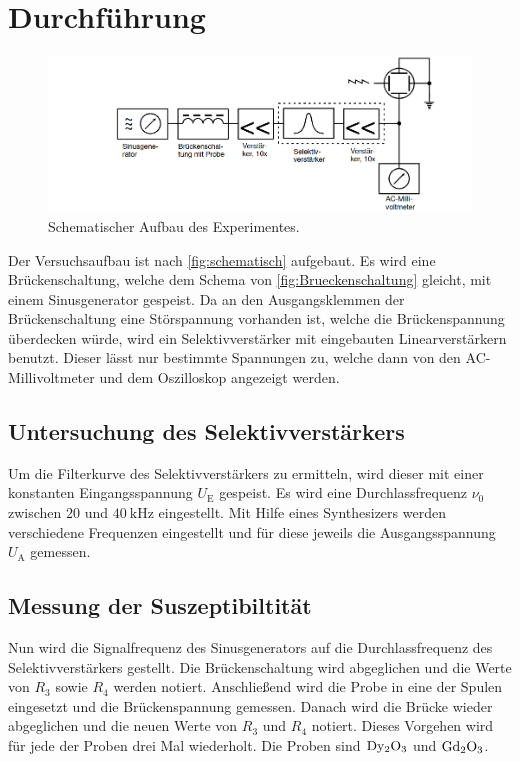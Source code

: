 \section{Durchführung}
\label{sec:Durchführung}
\begin{figure}
    \centering
    \includegraphics[width=\textwidth]{content/Aufbau.png}
    \caption{Schematischer Aufbau des Experimentes.\cite{anleitung}}
    \label{fig:schematisch}
\end{figure}
Der Versuchsaufbau ist nach \autoref{fig:schematisch} aufgebaut. 
Es wird eine Brückenschaltung, welche dem Schema von \autoref{fig:Brueckenschaltung} gleicht, mit einem Sinusgenerator gespeist.
Da an den Ausgangsklemmen der Brückenschaltung eine Störspannung vorhanden ist, welche die Brückenspannung überdecken würde, wird ein Selektivverstärker mit eingebauten Linearverstärkern benutzt.
Dieser lässt nur bestimmte Spannungen zu, welche dann von den AC-Millivoltmeter und dem Oszilloskop angezeigt werden. 

\subsection{Untersuchung des Selektivverstärkers}
Um die Filterkurve des Selektivverstärkers zu ermitteln, wird dieser mit einer konstanten Eingangsspannung $U_{\text{E}}$ gespeist.
Es wird eine Durchlassfrequenz $\nu_0$ zwischen $\num{20}$ und $\SI{40}{\kilo\hertz}$ eingestellt. 
Mit Hilfe eines Synthesizers werden verschiedene Frequenzen eingestellt und für diese jeweils die Ausgangsspannung $U_{\text{A}}$ gemessen.

\subsection{Messung der Suszeptibiltität}
Nun wird die Signalfrequenz des Sinusgenerators auf die Durchlassfrequenz des Selektivverstärkers gestellt.
Die Brückenschaltung wird abgeglichen und die Werte von $R_3$ sowie  $R_4$ werden notiert.
Anschließend wird die Probe in eine der Spulen eingesetzt und die Brückenspannung gemessen.
Danach wird die Brücke wieder abgeglichen und die neuen Werte von $R_3$ und $R_4$ notiert.
Dieses Vorgehen wird für jede der Proben drei Mal wiederholt.
Die Proben sind $\ce{Dy2O3}$ und $\ce{Gd2O3}$.